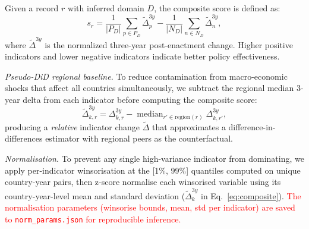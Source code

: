 \documentclass[11pt]{article}
\begin{document}
Given a record $r$ with inferred domain $D$, the composite score is defined as:
\begin{equation}
s_r = \frac{1}{|P_D|}\sum_{p \in P_D} \tilde{\Delta}^{3y}_{p}
    - \frac{1}{|N_D|}\sum_{n \in N_D} \tilde{\Delta}^{3y}_{n},
\label{eq:composite}
\end{equation}
where $\tilde{\Delta}^{3y}$ is the normalized three-year post-enactment change. Higher positive indicators and lower negative indicators indicate better policy effectiveness.

\begin{table}[!t]
\centering\small
\setlength{\tabcolsep}{3pt}
\caption{Domain-specific indicator groups used for composite outcome scoring.}
\label{tab:domain_inds}
\end{table}

\textit{Pseudo-DiD regional baseline.}
To reduce contamination from macro-economic shocks that affect all countries
simultaneously, we subtract the regional median
3-year delta from each indicator before computing the composite score:
\begin{equation}
\widetilde{\Delta}^{3y}_{k,r}
  = \Delta^{3y}_{k,r} - \operatorname{median}_{r'\in\text{region}(r)}\!\!\Delta^{3y}_{k,r'},
\label{eq:pseudo_did}
\end{equation}
producing a \emph{relative} indicator change $\widetilde{\Delta}$ that
approximates a difference-in-differences estimator with regional peers as
the counterfactual.

\textit{Normalisation.}
To prevent any single high-variance indicator from dominating, we apply
per-indicator winsorisation at the [1\%, 99\%] quantiles computed on unique
country-year pairs, then z-score normalise each winsorised variable using its
country-year-level mean and standard deviation ($\tilde{\Delta}^{3y}_{k}$ in
Eq.~\ref{eq:composite}).
\textcolor{red}{The normalisation parameters (winsorise bounds, mean, std per indicator) are
saved to \texttt{norm\_params.json} for reproducible inference.}
\end{document}
